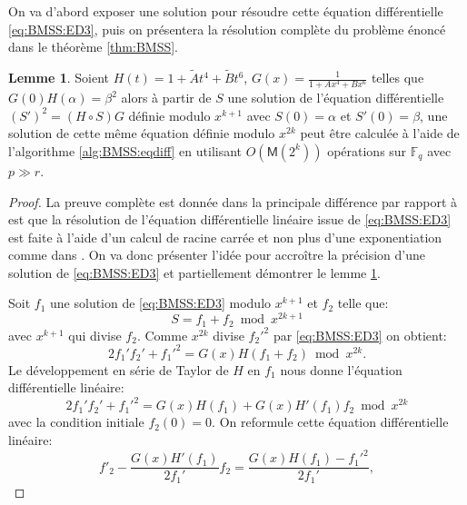 \documentclass[10pt,a4paper]{book}
\theoremstyle{plain}
\theoremstyle{definition}
\theoremstyle{definition}
\newtheorem{lem}[thm]{Lemme}
\theoremstyle{definition}
\theoremstyle{definition}
\theoremstyle{definition}
\theoremstyle{remark}
\theoremstyle{remark}
\theoremstyle{definition}
\begin{document}
On va d'abord exposer une solution pour résoudre cette équation différentielle \eqref{eq:BMSS:ED3}, puis on présentera la résolution complète du problème énoncé dans le théorème \ref{thm:BMSS}. 

\begin{lem}
\label{lem:BMSS}
Soient $H(t)=1+\tilde{A}t^4+\tilde{B}t^6$, $G(x)=\frac{1}{1+Ax^4+Bx^6}$ telles que $G(0)H(\alpha)=\beta^2$ alors à partir de $S$ une solution de l'équation différentielle $(S')^2=(H \circ S) G$ définie modulo $x^{k+1}$ avec $S(0)=\alpha$ et $S'(0)=\beta$, une solution de cette même équation définie modulo $x^{2k}$ peut être calculée à l'aide de l'algorithme \ref{alg:BMSS:eqdiff} en utilisant $O(\mathsf{M}(2^k))$ opérations sur $\mathbb{F}_q$ avec $p \gg r$.
\end{lem}

\begin{proof}
La preuve complète est donnée dans \cite{Lercier-Sirvent2008} la principale différence par rapport à \cite{BMSS08} est que la résolution de l'équation différentielle linéaire issue de \eqref{eq:BMSS:ED3} est faite à l'aide d'un calcul de racine carrée et non plus d'une exponentiation comme dans \cite{BMSS08}. 
On va donc présenter l'idée pour accroître la précision d'une solution de \eqref{eq:BMSS:ED3} et partiellement démontrer le lemme \ref{lem:BMSS}.

Soit $f_1$ une solution de \eqref{eq:BMSS:ED3} modulo $x^{k+1}$ et $f_2$ telle que:
\begin{equation}
S=f_1+f_2 \bmod x^{2k+1}
\end{equation}
avec $x^{k+1}$ qui divise $f_2$. Comme $x^{2k}$ divise $f_2'^2$ par \eqref{eq:BMSS:ED3} on obtient:
\begin{equation}
\label{eq:BMSS:ED4}
2f_1'f_2'+f_1'^2=G(x)H(f_1+f_2) \bmod x^{2k}.
\end{equation}
Le développement en série de Taylor de $H$ en $f_1$ nous donne l'équation différentielle linéaire:
\begin{equation}
2f_1'f_2'+f_1'^2=G(x)H(f_1)+G(x)H'(f_1)f_2 \bmod x^{2k}
\end{equation}
avec la condition initiale $f_2(0)=0$. On reformule cette équation 
différentielle linéaire:
\begin{equation}
\label{eq:LS08:diflin}
f'_2-\frac{G(x)H'(f_1)}{2f_1'}f_2=\frac{G(x)H(f_1)-f_1'^2}{2f_1'},
\end{equation}


\end{proof}
\end{document}
